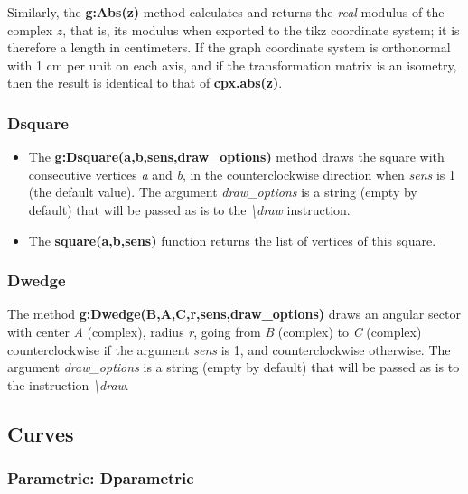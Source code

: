 Similarly, the \textbf{g:Abs(z)} method calculates and returns the \textit{real} modulus of the complex $z$, that is, its modulus when exported to the tikz coordinate system; it is therefore a length in centimeters. If the graph coordinate system is orthonormal with 1 cm per unit on each axis, and if the transformation matrix is ​​an isometry, then the result is identical to that of \textbf{cpx.abs(z)}.

\subsubsection{Dsquare}
\begin{itemize}
    \item The \textbf{g:Dsquare(a,b,sens,draw\_options)} method draws the square with consecutive vertices \emph{a} and \emph{b}, in the counterclockwise direction when \emph{sens} is 1 (the default value). The argument \emph{draw\_options} is a string (empty by default) that will be passed as is to the \emph{\textbackslash draw} instruction.
    \item The \textbf{square(a,b,sens)} function returns the list of vertices of this square. \end{itemize}

\subsubsection{Dwedge}
The method \textbf{g:Dwedge(B,A,C,r,sens,draw\_options)} draws an angular sector with center \emph{A} (complex), radius \emph{r}, going from \emph{B} (complex) to \emph{C} (complex) counterclockwise if the argument \emph{sens} is 1, and counterclockwise otherwise. The argument \emph{draw\_options} is a string (empty by default) that will be passed as is to the instruction \emph{\textbackslash draw}.

\subsection{Curves}

\subsubsection{Parametric: Dparametric}


